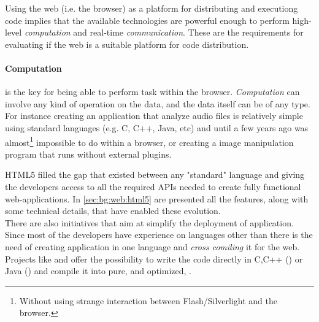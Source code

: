 


Using the web (i.e. the browser) as a platform for distributing and executiong
code implies that the available technologies are powerful enough to perform
high-level \emph{computation} and real-time \emph{communication}.
These are the requirements for evaluating if the web is a suitable platform for
code distribution.\\

\paragraph{Computation} is the key for being able to perform task within the
browser. \emph{Computation} can involve any kind of operation on the data, and
the data itself can be of any type. For instance creating an application that
analyze audio files is relatively simple using standard languages (e.g. C, C++,
Java, etc) and until a few years ago was almost\footnote{Without using strange
interaction between Flash/Silverlight and the browser.} impossible to do within
a browser, or creating a image manipulation program that runs without external
plugins.

HTML5 filled the gap that existed between any "standard" language and \js{}
giving the developers access to all the required APIs needed to create fully
functional web-applications. In \ref{sec:bg:web:html5} are presented all the
features, along with some technical details, that have enabled these evolution.\\

There are also initiatives that aim at simplify the deployment of \js{}
application. Since most of the developers have experience on languages other than
\js{} there is the need of creating application in one language and \emph{cross
comiling} it for the web. Projects like  and 
offer the possibility to write the code directly in C,C++ ()
or Java () and compile it into pure, and optimized, \js{}.

